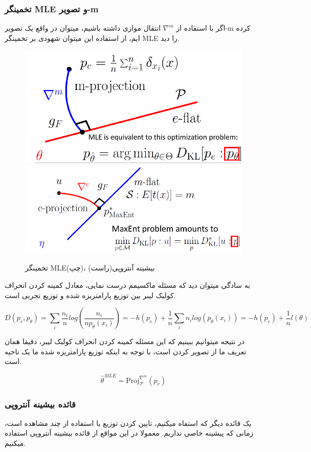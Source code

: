 \clearpage

\subsubsection{تخمینگر MLE و تصویر-m}

اگر با استفاده از $\nabla^m$ انتقال موازی داشته باشیم، میتوان در واقع یک تصویر-m کرده ایم، از استفاده این میتوان شهودی بر تخمینگر MLE را دید.

\begin{figure}[b]
    \centering
    \includegraphics*[width=0.49\linewidth]{Pictures/Q5/maximum-likelihood.png}
    \includegraphics*[width=0.49\linewidth]{Pictures/Q5/max-ent.png}
    \caption{تخمینگر MLE(چپ)، بیشینه آنتروپی(راست)}
\end{figure}

به سادگی میتوان دید که مسئله ماکسیمم درست نمایی، معادل کمینه کردن انحراف کولبک لیبر بین توزیع پارامتریزه شده و توزیع تجربی است.

$$
D(p_e, p_\theta) = \sum_i \frac{n_i}{n} log(\frac{n_i}{np_\theta(x_i)}) = -h(p_e) + \frac{1}{n} \sum_i n_i log(p_\theta(x_i))=-h(p_e)+\frac{1}{n}l(\theta)
$$

در نتیجه میتوانیم ببینیم که این مسئله کمینه کردن انحراف کولبک لیبر، دقیقا همان تعریف ما از تصویر کردن است، با توجه به اینکه توزیع پارامتریزه شده ما یک ناحیه  است.

$$
\hat{\theta}^{MLE}=\text{Proj}_{\mathcal{P}}^{\nabla^m}(p_e)
$$

\subsubsection{قائده بیشینه آنتروپی}

یک قائده دیگر که استفاه میکنیم، تایین کردن توزیع با استفاده از چند مشاهده است، زمانی که پیشینه خاصی نداریم.
معمولا در این مواقع از قائده بیشینه آنتروپی استفاده میکنیم.

